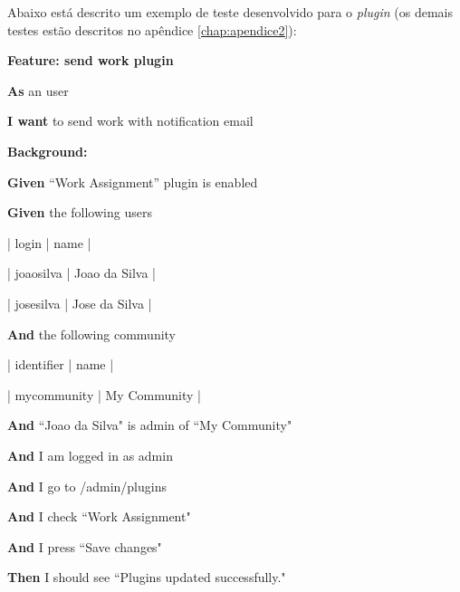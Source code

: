 Abaixo está descrito um exemplo de teste desenvolvido para o \textit{plugin} (os demais testes estão descritos no apêndice \ref{chap:apendice2}):

\textbf{Feature: send work plugin}

\textbf{As} an user

\textbf{I want} to send work with notification email

\textbf{Background:}

\textbf{Given} ``Work Assignment'' plugin is enabled

\textbf{Given} the following users

      | login     | name          |

      | joaosilva | Joao da Silva |

      | josesilva | Jose da Silva |

\textbf{And} the following community

      | identifier  | name         |

      | mycommunity | My Community |

\textbf{And} ``Joao da Silva" is admin of ``My Community"

\textbf{And} I am logged in as admin

\textbf{And} I go to /admin/plugins

\textbf{And} I check ``Work Assignment"

\textbf{And} I press ``Save changes"

\textbf{Then} I should see ``Plugins updated successfully." 


